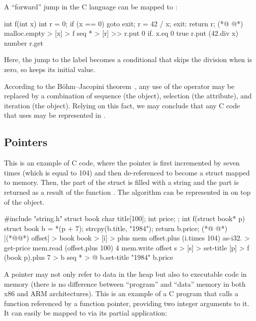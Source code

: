 A ``forward'' jump in the C language can be mapped to \eolang{}:

\begin{ffcode}
int f(int x) {
  int r = 0;
  if (x == 0)
    goto exit;
  r = 42 / x;
  exit:
  return r;
}
(*@ \ffcolumnbreak @*)
malloc.empty > [x] > f
  seq * > [r] >>
    r.put 0
    if.
      x.eq 0
      true
      r.put (42.div x)
    number r.get
\end{ffcode}

Here, the jump to the  label becomes a conditional that skips
  the division when  is zero, so  keeps its initial value.

According to the B\"{o}hm–Jacopini theorem~\citep{bohm1966flow},
  any use of the  operator may be replaced
  by a combination of
  sequence (the  object),
  selection (the  attribute),
  and
  iteration (the  object).
Relying on this fact, we may conclude that any C code that uses 
  may be represented in \eolang{}.

\subsection{Pointers}
\label{sec:pointers}

This is an example of C code, where the pointer  is first incremented
  by seven times  (which is equal to 104)
  and then de-referenced to become a struct  mapped to memory.
Then, the  part of the struct is filled with a string
  and the  part is returned as a result of the function .
The algorithm can be represented in \eolang{} on top of the  object.

\begin{ffcode}
#include "string.h"
struct book {
  char title[100];
  int price;
};
int f(struct book* p) {
  struct book b = *(p + 7);
  strcpy(b.title, "1984");
  return b.price;
}
(*@ \ffcolumnbreak @*)
[(*@@*) offset] > book
  book > [i] > plus
    mem
    offset.plus (i.times 104)
  as-i32. > get-price
    mem.read (offset.plus 100) 4
  mem.write offset s > [s] > set-title
[p] > f
  (book p).plus 7 > b
  seq * > @
    b.set-title "1984"
    b.price
\end{ffcode}

A pointer may not only refer to data in the heap but also
  to executable code in memory (there is no difference between
  ``program'' and ``data'' memory in both x86 and ARM architectures).
This is an example of a C program that calls a function referenced
  by a function pointer, providing two integer arguments to it.
It can easily be mapped to \eolang{} via its partial application:


